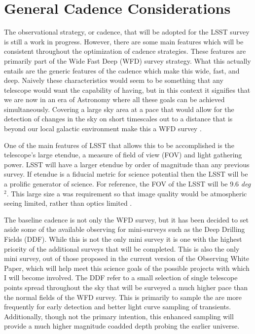 \documentclass[11pt]{article}
\begin{document}
\section{General Cadence Considerations} %
The observational strategy, or cadence, that will be adopted for the LSST survey is still a work in progress. However, there are some main features which will be consistent throughout the optimization of cadence strategies. These features are primarily part of the Wide Fast Deep (WFD) survey strategy. What this actually entails are the generic features of the cadence which make this wide, fast, and deep. Naively these characteristics would seem to be something that any telescope would want the capability of having, but in this context it signifies that we are now in an era of Astronomy where all these goals can be achieved simultaneously. Covering a large sky area at a pace that would allow for the detection of changes in the sky on short timescales out to a distance that is beyond our local galactic environment make this a WFD survey \citep{LSSTScienceCollaboration2009}. \par
One of the main features of LSST that allows this to be accomplished is the telescope's large etendue, a measure of field of view (FOV) and light gathering power. LSST will have a larger etendue by order of magnitude than any previous survey. If etendue is a fiducial metric for science potential then the LSST will be a prolific generator of science. For reference, the FOV of the LSST will be 9.6 \textit{deg}$^2$. This large size a was requirement so that image quality would be atmospheric seeing limited, rather than optics limited \citep{LSSTScienceCollaboration2009}.    \par
The baseline cadence is not only the WFD survey, but it has been decided to set aside some of the available observing for mini-surveys such as the Deep Drilling Fields (DDF). While this is not the only mini survey it is one with the highest priority of the additional surveys that will be completed. This is also the only mini survey, out of those proposed in the current version of the Observing White Paper, which will help meet this science goals of the possible projects with which I will become involved. The DDF refer to a small selection of single telescope points spread throughout the sky that will be surveyed a much higher pace than the normal fields of the WFD survey. This is primarily to sample the are more frequently for early detection and better light curve sampling of transients. Additionally, though not the primary intention, this enhanced sampling will provide a much higher magnitude coadded depth probing the earlier universe. \par
\end{document}
